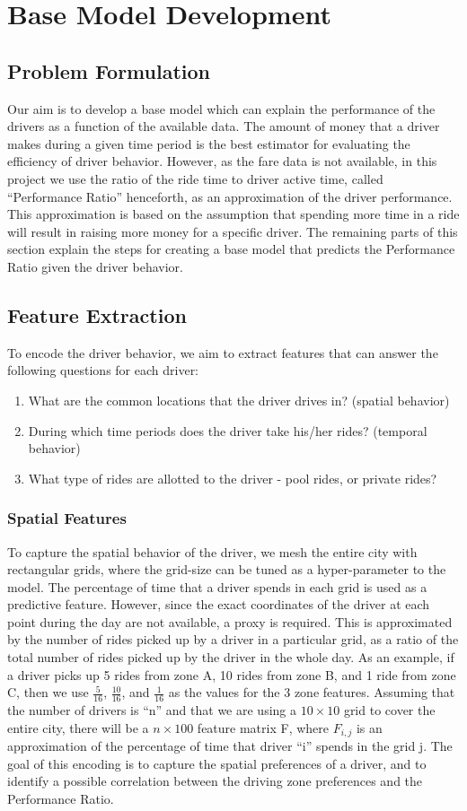 \documentclass[11pt]{article}
\begin{document}
\section{Base Model Development}
\subsection{Problem Formulation}
Our aim is to develop a base model which can explain the performance of the drivers as a function of the available data. The amount of money that a driver makes during a given time period is the best estimator for evaluating the efficiency of driver behavior. However, as the fare data is not available, in this project we use the ratio of the ride time to driver active time, called “Performance Ratio” henceforth, as an approximation of the driver performance. This approximation is based on the assumption that spending more time in a ride will result in raising more money for a specific driver. The remaining parts of this section explain the steps for creating a base model that predicts the Performance Ratio given the driver behavior. 

\subsection{Feature Extraction}
To encode the driver behavior, we aim to extract features that can answer the following questions for each driver:
\begin{enumerate}
\item What are the common locations that the driver drives in? (spatial behavior)
\item During which time periods does the driver take his/her rides? (temporal behavior)
\item What type of rides are allotted to the driver - pool rides, or private rides?
\end{enumerate}

\subsubsection{Spatial Features}
To capture the spatial behavior of the driver, we mesh the entire city with rectangular grids, where the grid-size can be tuned as a hyper-parameter to the model. The percentage of time that a driver spends in each grid is used as a predictive feature. However, since the exact coordinates of the driver at each point during the day are not available, a proxy is required. This is approximated by the number of rides picked up by a driver in a particular grid, as a ratio of the total number of rides picked up by the driver in the whole day. As an example, if a driver picks up 5 rides from zone A, 10 rides from zone B, and 1 ride from zone C, then we use $\frac{5}{16}$, $\frac{10}{16}$, and $\frac{1}{16}$ as the values for the 3 zone features. Assuming that the number of drivers is “n” and that we are using a $10\times10$ grid to cover the entire city, there will be a $n\times100$ feature matrix F, where $F_{i,j}$ is an approximation of the percentage of time that driver “i” spends in the grid j. The goal of this encoding is to capture the spatial preferences of a driver, and to identify  a possible correlation between the driving zone preferences and the Performance Ratio.  
\end{document}
